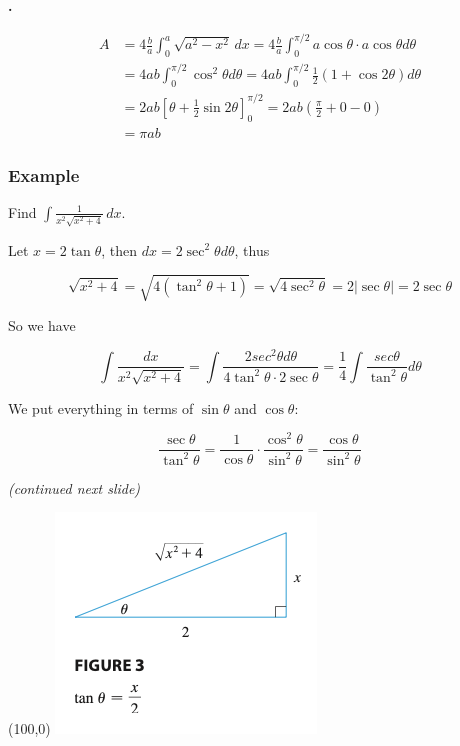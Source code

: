 \documentclass[t]{beamer}
\theoremstyle{plain}
\theoremstyle{definition}
\newcounter{heading}
\newcommand{\newhead}[1]{\medskip\stepcounter{heading}\noindent\textbf{\hspace{0.2cm}{#1}.}}
\begin{document}
\begin{frame}

\newhead{Continued..}

\begin{align*}
A &= 4\frac{b}{a}\int_0^a \sqrt{a^2 - x^2} \,dx = 4\frac{b}{a}\int_0^{\pi/2} a \cos\theta \cdot a\cos\theta d\theta\\
&= 4ab \int_0^{\pi/2} \cos^2\theta d\theta = 4ab\int_0^{\pi/2}\frac{1}{2}(1 + \cos 2\theta) d\theta\\
&= 2ab \left[\theta + \frac{1}{2}\sin 2\theta\right]_0^{\pi/2} = 2ab\left(\frac{\pi}{2} + 0 - 0\right)\\
&= \pi a b
\end{align*}

\end{frame}

\begin{frame}

\frametitle{Example} 
\footnotesize
Find $\int \frac{1}{x^{2}\sqrt{x^{2}+4}}\,dx$. \pause

\medskip

Let $x = 2\tan\theta$, then $dx = 2 \sec^2\theta d\theta$, thus

$$\sqrt{x^2 + 4} = \sqrt{4(\tan^2\theta + 1)} = \sqrt{4\sec^2\theta} = 2 |\sec\theta| = 2 \sec\theta$$

So we have

$$\int\frac{dx}{x^2\sqrt{x^2 + 4}} = \int\frac{2sec^2\theta d\theta}{4\tan^2\theta \cdot 2\sec\theta} = \frac{1}{4}\int\frac{sec\theta}{\tan^2\theta}d\theta$$

We put everything in terms of $\sin\theta$ and $\cos\theta$:

$$\frac{\sec\theta}{\tan^2\theta} = \frac{1}{\cos\theta} \cdot \frac{\cos^2\theta}{\sin^2\theta} = \frac{\cos\theta}{\sin^2\theta}$$

\textit{(continued next slide)}

\begin{textblock}{0.3}(100,0)
      \includegraphics[scale=0.6]{fig/csc}
\end{textblock}

\end{frame}
\end{document}

